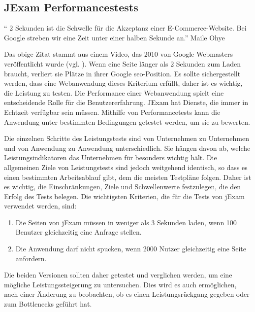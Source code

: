 \subsection{JExam Performancestests}

\begin{center}
`` 2 Sekunden ist die Schwelle f\"ur die Akzeptanz einer E-Commerce-Website.
Bei Google streben wir eine Zeit unter einer halben Sekunde an.'' Maile Ohye
\end{center}
\>

Das obige Zitat stammt aus einem Video, das 2010 von Google Webmasters
ver\"offentlicht wurde (vgl. \cite{Ohye2010}). Wenn eine Seite l\"anger
als 2 Sekunden zum Laden braucht, verliert sie Pl\"atze in ihrer Google
\acs{seo}-Position. Es sollte sichergestellt werden, dass eine
Webanwendung dieses Kriterium erfüllt, daher ist es wichtig,
die Leistung zu testen. Die Performance einer Webanwendung spielt eine
entscheidende Rolle f\"ur die Benutzererfahrung. JExam hat Dienste,
die immer in Echtzeit verf\"ugbar sein m\"ussen. Mithilfe von 
Performancetests kann die Anwendung unter bestimmten Bedingungen 
getestet werden, um sie zu bewerten.

Die einzelnen Schritte des Leistungstests sind von Unternehmen
zu Unternehmen und von Anwendung zu Anwendung unterschiedlich.
Sie hängen davon ab, welche Leistungsindikatoren das Unternehmen für
besonders wichtig hält. Die allgemeinen Ziele von Leistungstests
sind jedoch weitgehend identisch, so dass es einen bestimmten
Arbeitsablauf gibt, dem die meisten Testpläne folgen. Daher ist es
wichtig, die Einschränkungen, Ziele und Schwellenwerte festzulegen,
die den Erfolg des Tests belegen. Die wichtigsten Kriterien,
die für die Tests von jExam verwendet werden, sind:

\noindent
\begin{enumerate}
    \item Die Seiten von jExam müssen in weniger als 3 Sekunden laden,
    wenn 100 Benutzer gleichzeitig eine Anfrage stellen.
    \item Die Anwendung darf nicht spucken, wenn 2000 Nutzer
    gleichzeitig eine Seite anfordern.
\end{enumerate}

Die beiden Versionen sollten daher getestet und verglichen werden,
um eine mögliche Leistungssteigerung zu untersuchen.
Dies wird es auch ermöglichen, nach einer Änderung zu beobachten, ob
es einen Leistungsrückgang gegeben oder zum Bottlenecks geführt hat.